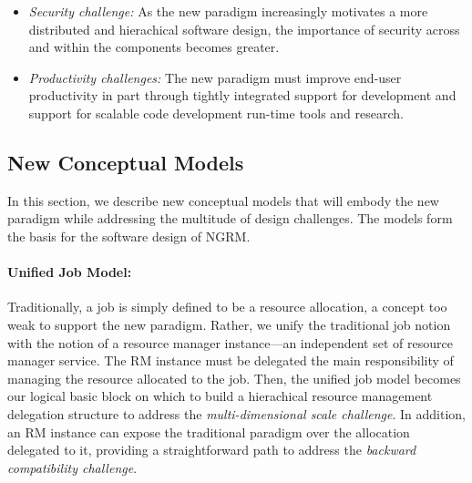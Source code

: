 \documentclass{article}
\newcommand{\ngrm}{NGRM}
\begin{document}
\begin{itemize}
\item{\sl Security challenge:} As the new paradigm increasingly motivates
     a more distributed and hierachical software design, 
     the importance of security across and within the components becomes greater.

\item{\sl Productivity challenges:} The new paradigm must improve end-user 
     productivity in part through tightly integrated support for development
     and support for scalable code development run-time tools and research.

\end{itemize}


\subsection{New Conceptual Models}
In this section, we describe new conceptual models that will embody 
the new paradigm while addressing the multitude of design challenges. 
The models form the basis for the software design of \ngrm.

\paragraph{Unified Job Model:}
Traditionally, a job is simply defined to be a resource allocation, 
a concept too weak to support the new paradigm. 
Rather, we unify the traditional job notion 
with the notion of a resource manager instance---an independent set of resource manager service.
The RM instance must be delegated the main responsibility of managing the resource allocated to the job.
Then, the unified job model becomes our logical basic block
on which to build a hierachical resource management 
delegation structure to address the {\sl multi-dimensional scale challenge}.
In addition, an RM instance can expose the traditional paradigm over the
allocation delegated to it, providing a straightforward path to address
the {\sl backward compatibility challenge}. 
\end{document}
